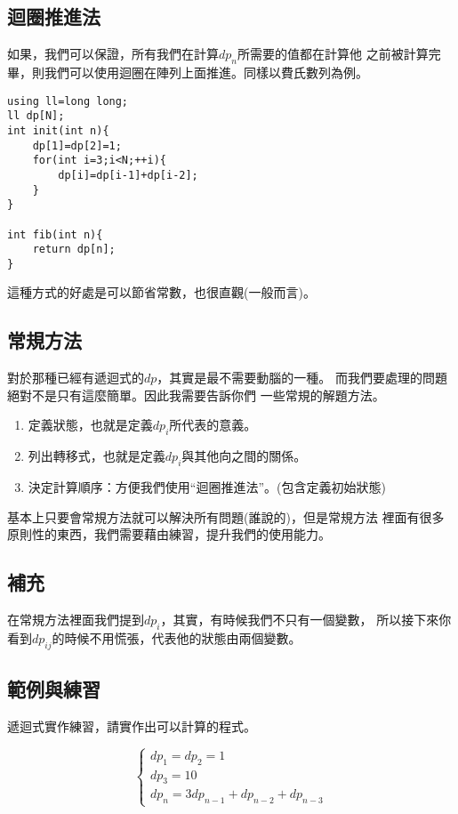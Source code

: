     \subsection{迴圈推進法}
    如果，我們可以保證，所有我們在計算$dp_n$所需要的值都在計算他
    之前被計算完畢，則我們可以使用迴圈在陣列上面推進。同樣以費氏數列為例。

\begin{lstlisting}[caption=費氏數列的遞迴DP]
using ll=long long;
ll dp[N];
int init(int n){
    dp[1]=dp[2]=1;
    for(int i=3;i<N;++i){
        dp[i]=dp[i-1]+dp[i-2];
    }
}

int fib(int n){
    return dp[n];
}
\end{lstlisting}

    這種方式的好處是可以節省常數，也很直觀(一般而言)。

    \subsection{常規方法}
    對於那種已經有遞迴式的$dp$，其實是最不需要動腦的一種。
    而我們要處理的問題絕對不是只有這麼簡單。因此我需要告訴你們
    一些常規的解題方法。

    \begin{enumerate}
        \item 定義狀態，也就是定義$dp_i$所代表的意義。
        \item 列出轉移式，也就是定義$dp_i$與其他向之間的關係。
        \item 決定計算順序：方便我們使用``迴圈推進法''。(包含定義初始狀態)
    \end{enumerate}

    基本上只要會常規方法就可以解決所有問題(誰說的)，但是常規方法
    裡面有很多原則性的東西，我們需要藉由練習，提升我們的使用能力。

    \subsection{補充}
    在常規方法裡面我們提到$dp_i$，其實，有時候我們不只有一個變數，
    所以接下來你看到$dp_{ij}$的時候不用慌張，代表他的狀態由兩個變數。

    \subsection{範例與練習}

    \problem 遞迴式實作練習，請實作出可以計算的程式。

    $$
    \begin{cases}
        dp_1=dp_2=1 \\
        dp_3=10 \\
        dp_n=3dp_{n-1}+dp_{n-2}+dp_{n-3}
    \end{cases}
    $$

